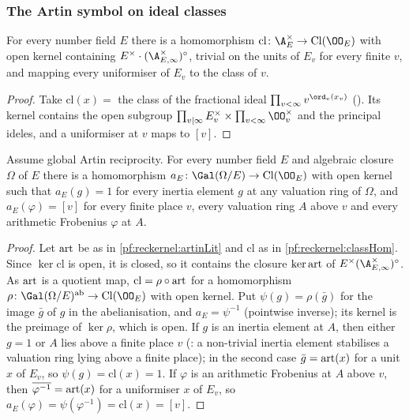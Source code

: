 \subsubsection{The Artin symbol on ideal classes}

\begin{lemma}\label{pf:reckernel:classHom}
For every number field $E$ there is a homomorphism $\mathrm{cl}\colon\A_E^\times\to\operatorname{Cl}(\OO_E)$ with open kernel
containing $E^\times\cdot(\A_{E,\infty}^\times)^\circ$, trivial on the units of $E_v$ for every finite $v$, and
mapping every uniformiser of $E_v$ to the class of $v$.
\end{lemma}

\begin{proof}
Take $\mathrm{cl}(x)=$ the class of the fractional ideal $\prod_{v<\infty}v^{\ord_v(x_v)}$
(). Its kernel contains the open subgroup
$\prod_{v\mid\infty}E_v^\times\times\prod_{v<\infty}\OO_v^\times$ and the principal ideles, and a uniformiser at
$v$ maps to $[v]$.
\end{proof}

\begin{lemma}\label{pf:reckernel:artinSymbol}
Assume global Artin reciprocity. For every number field $E$ and algebraic closure $\Omega$ of $E$ there is a
homomorphism $a_E\colon\Gal(\Omega/E)\to\operatorname{Cl}(\OO_E)$ with open kernel such that $a_E(g)=1$ for every inertia element
$g$ at any valuation ring of $\Omega$, and $a_E(\varphi)=[v]$ for every finite place $v$, every valuation ring $A$
above $v$ and every arithmetic Frobenius $\varphi$ at $A$.
\end{lemma}

\begin{proof}
Let $\operatorname{art}$ be as in \cref{pf:reckernel:artinLit} and $\mathrm{cl}$ as in \cref{pf:reckernel:classHom}. Since
$\ker\mathrm{cl}$ is open, it is closed, so it contains the closure $\ker\operatorname{art}$ of
$E^\times(\A_{E,\infty}^\times)^\circ$. As $\operatorname{art}$ is a quotient map, $\mathrm{cl}=\rho\circ\operatorname{art}$ for a
homomorphism $\rho\colon\Gal(\Omega/E)^{\mathrm{ab}}\to\operatorname{Cl}(\OO_E)$ with open kernel. Put $\psi(g)=\rho(\bar g)$ for
the image $\bar g$ of $g$ in the abelianisation, and $a_E=\psi^{-1}$ (pointwise inverse); its kernel is the
preimage of $\ker\rho$, which is open. If $g$ is an inertia element at $A$, then either $g=1$ or $A$ lies above a
finite place $v$ (: a non-trivial inertia element
stabilises a valuation ring lying above a finite place); in the second case
$\bar g=\operatorname{art}(x)$ for a unit $x$ of $E_v$, so $\psi(g)=\mathrm{cl}(x)=1$. If $\varphi$ is an arithmetic
Frobenius at $A$ above $v$, then $\overline{\varphi^{-1}}=\operatorname{art}(x)$ for a uniformiser $x$ of $E_v$, so
$a_E(\varphi)=\psi(\varphi^{-1})=\mathrm{cl}(x)=[v]$.
\end{proof}

